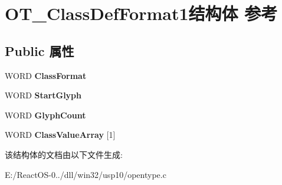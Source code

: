 \hypertarget{struct_o_t___class_def_format1}{}\section{O\+T\+\_\+\+Class\+Def\+Format1结构体 参考}
\label{struct_o_t___class_def_format1}
\subsection*{Public 属性}
\begin{DoxyCompactItemize}
\item 
\mbox{\label{struct_o_t___class_def_format1_a269aa76b3f8fba5d14b540f968ffcc31}} 
W\+O\+RD {\bfseries Class\+Format}
\item 
\mbox{\label{struct_o_t___class_def_format1_acdd25bf6c720d31b045fb50e7fbfe6fc}} 
W\+O\+RD {\bfseries Start\+Glyph}
\item 
\mbox{\label{struct_o_t___class_def_format1_a245218f0688ab438c61eed5956d36256}} 
W\+O\+RD {\bfseries Glyph\+Count}
\item 
\mbox{\label{struct_o_t___class_def_format1_a6cb3cdc1b2eb2ddb08077fd608442aac}} 
W\+O\+RD {\bfseries Class\+Value\+Array} \mbox{[}1\mbox{]}
\end{DoxyCompactItemize}


该结构体的文档由以下文件生成\+:\begin{DoxyCompactItemize}
\item 
E\+:/\+React\+O\+S-\/0../dll/win32/usp10/opentype.\+c\end{DoxyCompactItemize}
